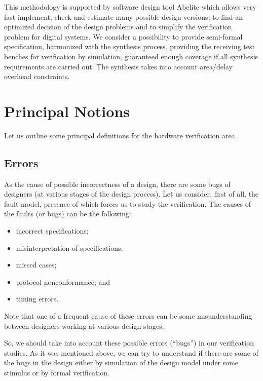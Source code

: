 \begin{multicols}{2}
    This methodology is supported by software design tool Abelite which allows very fast implement, check
and estimate many possible design versions, to find an optimized decision of the design problems and to
simplify the verification problem for digital systems. We consider a possibility to provide semi-formal
specification, harmonized with the synthesis process, providing the receiving
test benches for verification by
simulation, guaranteed enough coverage if all synthesis requirements
are carried out. The synthesis takes into account area/delay overhead constraints.

\section{Principal Notions}

   \noindent
Let us outline some principal definitions for the hardware verification area.

\subsection{Errors} %

\noindent
As the cause of possible incorrectness of a design, there are some bugs of designers (at various stages of the
design process). Let us consider, first of all, the fault model, presence of which forces us to study the
verification. The causes of the faults (or bugs) can be the following:
 \begin{itemize}
\item incorrect specifications;
\item misinterpretation of specifications;
\item missed cases;
\item protocol nonconformance; and
\item timing errors.
\end{itemize}

   Note that one of a frequent cause of these errors can be some misunderstanding between designers
working at  various design stages.

   So, we should take into account these possible errors (``bugs'') in our verification studies. As it was
mentioned above, we can try to understand if there are some of the bugs in the design either by simulation of the
design model under some stimulus or by formal verification.


\end{multicols}
